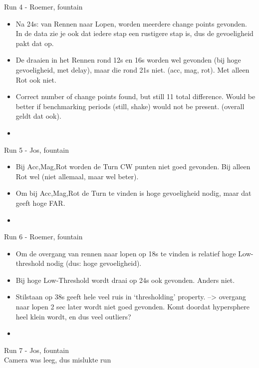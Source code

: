Run 4 - Roemer, fountain \\
\begin{itemize}
  \item Na 24s: van Rennen naar Lopen, worden meerdere change points gevonden. In de data zie je ook dat iedere stap een rustigere stap is, dus de gevoeligheid pakt dat op.
  \item De draaien in het Rennen rond 12s en 16s worden wel gevonden (bij hoge gevoeligheid, met delay), maar die rond 21s niet. (acc, mag, rot). Met alleen Rot ook niet.
  \item Correct number of change points found, but still 11 total difference. Would be better if benchmarking periods (still, shake) would not be present. (overall geldt dat ook).
  \item
\end{itemize}

Run 5 - Jos, fountain \\
\begin{itemize}
  \item Bij Acc,Mag,Rot worden de Turn CW punten niet goed gevonden. Bij alleen Rot wel (niet allemaal, maar wel beter).
  \item Om bij Acc,Mag,Rot de Turn te vinden is hoge gevoeligheid nodig, maar dat geeft hoge FAR.
  \item
\end{itemize}

Run 6 - Roemer, fountain \\
\begin{itemize}
  \item Om de overgang van rennen naar lopen op 18s te vinden is relatief hoge Low-threshold nodig (dus: hoge gevoeligheid).
  \item Bij hoge Low-Threshold wordt draai op 24s ook gevonden. Anders niet.
  \item Stilstaan op 38s geeft hele veel ruis in `thresholding' property. --> overgang naar lopen 2 sec later wordt niet goed gevonden. Komt doordat hypersphere heel klein wordt, en dus veel outliers?
  \item
\end{itemize}

Run 7 - Jos, fountain \\
Camera was leeg, dus mislukte run

